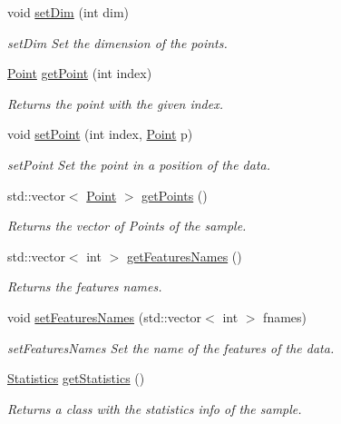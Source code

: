 \begin{DoxyCompactItemize}
void \hyperlink{class_data_aeedfb7697a9b3e6fec681b991cb46daa}{set\+Dim} (int dim)
\begin{DoxyCompactList}\small\item\em set\+Dim Set the dimension of the points. \end{DoxyCompactList}\item 
\hyperlink{class_point}{Point} \hyperlink{class_data_a8cc66e410f7288913204585f215b786d}{get\+Point} (int index)
\begin{DoxyCompactList}\small\item\em Returns the point with the given index. \end{DoxyCompactList}\item 
void \hyperlink{class_data_a9f34656f179b152407d51b04aab70748}{set\+Point} (int index, \hyperlink{class_point}{Point} p)
\begin{DoxyCompactList}\small\item\em set\+Point Set the point in a position of the data. \end{DoxyCompactList}\item 
std\+::vector$<$ \hyperlink{class_point}{Point} $>$ \hyperlink{class_data_a8fe9ce813848765a7615b909c4654b55}{get\+Points} ()
\begin{DoxyCompactList}\small\item\em Returns the vector of Points of the sample. \end{DoxyCompactList}\item 
std\+::vector$<$ int $>$ \hyperlink{class_data_a2f6399baee6535e7f48250da54fbf00d}{get\+Features\+Names} ()
\begin{DoxyCompactList}\small\item\em Returns the features names. \end{DoxyCompactList}\item 
void \hyperlink{class_data_a2702b6464d7299c3b62e4eb4390fecd6}{set\+Features\+Names} (std\+::vector$<$ int $>$ fnames)
\begin{DoxyCompactList}\small\item\em set\+Features\+Names Set the name of the features of the data. \end{DoxyCompactList}\item 
\hyperlink{class_statistics}{Statistics} \hyperlink{class_data_a26376768a100f1999ef3ac15a2aa2a67}{get\+Statistics} ()
\begin{DoxyCompactList}\small\item\em Returns a class with the statistics info of the sample. \end{DoxyCompactList}\item 

\end{DoxyCompactItemize}
